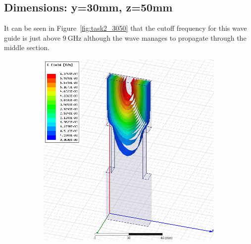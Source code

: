 \documentclass[12pt,a4paper]{article}
\begin{document}
\subsection{Dimensions: y=30mm, z=50mm}
It can be seen in Figure~\ref{fig:task2_3050} that the cutoff frequency for this wave guide is just above $\SI{9}{\giga\hertz}$ although the wave manages to propagate through the middle section.
\begin{figure}
  \centering
  \begin{subfigure}[b]{0.49\textwidth}
    \includegraphics[width=\textwidth]{./mid_sec_30mm_wide_50mm_long/4ghz.png}
    \label{fig:2_3050_4ghz}
  \end{subfigure}
  \begin{subfigure}[b]{0.49\textwidth}

\end{subfigure}
\end{figure}
\end{document}
